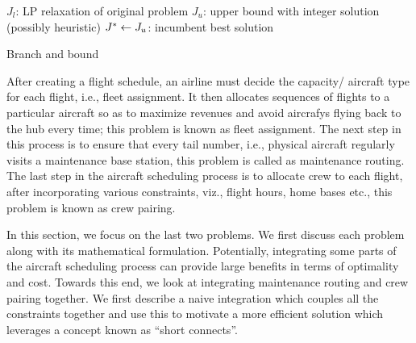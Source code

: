\documentclass[letterpaper, 10pt, twocolumn, reqno]{amsart}
\begin{document}
\IncMargin{0.04in}
\begin{algorithm}[!h]
\footnotesize
$J_l$: LP relaxation of original problem\;
$J_u$: upper bound with integer solution (possibly heuristic)\;
$J^* \leftarrow J_u$: incumbent best solution\;
\vspace{0.05in}
{
}
\caption{Branch and bound}
\label{alg:bnb}
\end{algorithm}
\DecMargin{0.04in}


After creating a flight schedule, an airline must decide the capacity/ aircraft type for each flight, i.e., fleet assignment. It then allocates sequences of flights to a particular aircraft so as to maximize revenues and avoid aircrafys flying back to the hub every time; this problem is known as fleet assignment. The next step in this process is to ensure that every tail number, i.e., physical aircraft regularly visits a maintenance base station, this problem is called as maintenance routing. The last step in the aircraft scheduling process is to allocate crew to each flight, after incorporating various constraints, viz., flight hours, home bases etc., this problem is known as crew pairing.

In this section, we focus on the last two problems. We first discuss each problem along with its mathematical formulation. Potentially, integrating some parts of the aircraft scheduling process can provide large benefits in terms of optimality and cost. Towards this end, we look at integrating maintenance routing and crew pairing together. We first describe a naive integration which couples all the constraints together and use this to motivate a more efficient solution which leverages a concept known as ``short connects''.
\end{document}
